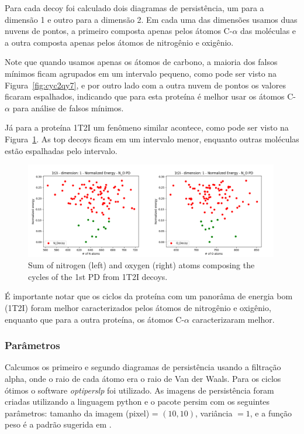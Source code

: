 Para cada decoy foi calculado dois diagramas de persistência, um para a dimensão 1 e outro para a dimensão 2.
Em cada uma das dimensões usamos duas nuvens de pontos, a primeiro composta apenas pelos átomos C-$\alpha$
das moléculas e a outra composta apenas pelos átomos de nitrogênio e oxigênio.

Note que quando usamos apenas os átomos de carbono, a maioria dos falsos mínimos ficam agrupados em um intervalo
pequeno, como pode ser visto na Figura~\ref{fig:cyc2qy7}, e por outro lado com a outra nuvem de pontos os valores
ficaram espalhados, indicando que para esta proteína é melhor usar os átomos C-$\alpha$ para análise de falsos
mínimos.

Já para a proteína 1T2I um fenômeno similar acontece, como pode ser visto na Figura~\ref{fig:nocyc}. As top decoys
ficam em um intervalo menor, enquanto outras moléculas estão espalhadas pelo intervalo.
\begin{figure}[!htbp]
    \centering
    \includegraphics[width=0.99\textwidth]{images/relatorio/NOcyc.png}
    \caption{Sum of nitrogen (left) and oxygen (right) atoms composing the cycles of the 1st PD from 1T2I decoys.}
    \label{fig:nocyc}
\end{figure}

É importante notar que os ciclos da proteína com um panorâma de energia bom (1T2I) foram melhor caracterizados
pelos átomos de nitrogênio e oxigênio, enquanto que para a outra proteína, os átomos C-$\alpha$ caracterizaram melhor.

\subsubsection{Parâmetros}

Calcumos os primeiro e segundo diagramas de persistência usando a filtração alpha, onde o raio de cada átomo
era o raio de Van der Waals. Para os ciclos ótimos o software \textit{optiperslp} foi utilizado. As imagens
de persistência foram criadas utilizando a linguagem python e o pacote persim \cite{scikittda2019} com
os seguintes parâmetros: tamanho da imagem (pixel) = $(10,10)$, variância $=1$, e a função peso é a padrão
sugerida em \cite{Adams2017}.

